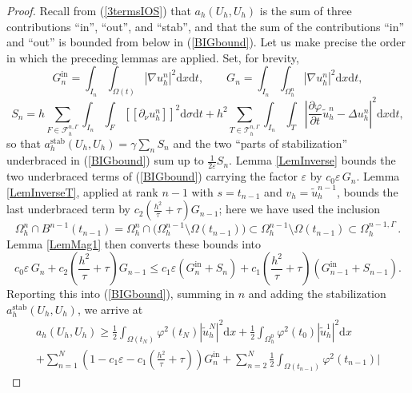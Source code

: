 \documentclass[10pt,a4paper]{amsart}
\newcommand{\dsigma}{\mathrm{d}\sigma}
\newcommand{\dt}{\mathrm{d}t}
\newcommand{\dx}{\mathrm{d}x}
\begin{document}
\begin{proof}
  Recall from (\ref{3termsIOS}) that $a_h (U_h, U_h)$ is the sum of three
  contributions ``in'', ``out'', and ``stab'', and that the sum of the contributions ``in''  and ``out'' is bounded from below in (\ref{BIGbound}).
  Let us make precise the order in which the preceding lemmas are applied. %
  Set, for brevity,
  \[ G_n^{\mathrm{in}} = \int_{I_n} \int_{\Omega (t)} | \nabla u^n_h |^2 \dx \dt , \qquad
     G_n = \int_{I_n} \int_{\Omega^n_h} | \nabla u^n_h |^2 \dx \dt , \]
  \[ S_n = h \sum_{F\in\mathcal{F}_h^{n, \Gamma}}\int_{I_n} \int_{F} [\![\partial_\nu u^n_h]\!]^2 \dsigma \dt
     + h^2 \sum_{T\in\mathcal{T}_h^{n,\Gamma}}\int_{I_n} \int_{T} \left| \frac{\partial \varphi}{\partial t}  \tilde{u}_h^n - \Delta u^n_h \right|^2 \dx \dt , \]
  so that $a_h^{\mathrm{stab}}(U_h,U_h)=\gamma\sum_n S_n$ and the two ``parts of stabilization'' underbraced in (\ref{BIGbound}) sum up to $\frac{1}{2\varepsilon}S_n$.
  Lemma \ref{LemInverse} bounds the two underbraced terms of (\ref{BIGbound}) carrying the factor $\varepsilon$ by $c_0\varepsilon\, G_n$. Lemma \ref{LemInverseT}, applied at rank $n-1$ with $s=t_{n-1}$ and $v_h=\tilde u_h^{n-1}$, bounds the last underbraced term by $c_2\left(\frac{h^2}{\tau}+\tau\right) G_{n-1}$; here we have used the inclusion
  \[ \Omega^n_h \cap B^{n - 1} (t_{n - 1}) = \Omega_h^n\cap\big(\Omega_h^{n-1}\setminus\Omega(t_{n-1})\big)
  \subset \Omega_h^{n-1}\setminus\Omega(t_{n-1})
  \subset \Omega_h^{n-1,\Gamma} \,.\]
Lemma \ref{LemMag1} then converts these bounds into
  \[ c_0\varepsilon\, G_n + c_2\left(\frac{h^2}{\tau}+\tau\right) G_{n-1} \leqslant c_1\varepsilon\left(G_n^{\mathrm{in}} + S_n\right) + c_1\left(\frac{h^2}{\tau}+\tau\right)\left(G_{n-1}^{\mathrm{in}} + S_{n-1}\right) . \]
  Reporting this into (\ref{BIGbound}), summing in $n$ and adding the stabilization $a_h^{\mathrm{stab}}(U_h,U_h)$, we arrive at
  \begin{multline*} a_h (U_h, U_h) \geqslant \frac{1}{2}  \int_{\Omega (t_N)} \varphi^2 (t_N) |
	\tilde{u}_h^N |^2 \dx + \frac{1}{2}  \int_{\Omega_h^0} \varphi^2 (t_0) |
	\tilde{u}_h^1 |^2 \dx \\
	+ \sum_{n = 1}^N \left( 1-c_1 \varepsilon - c_1 \left(\frac{h^2}{\tau}+\tau\right) \right) G_n^{\mathrm{in}} +
	\sum_{n = 2}^N \frac{1}{2}  \int_{\Omega (t_{n - 1})} \varphi^2 (t_{n - 1})  |

\end{multline*}
\end{proof}
\end{document}
